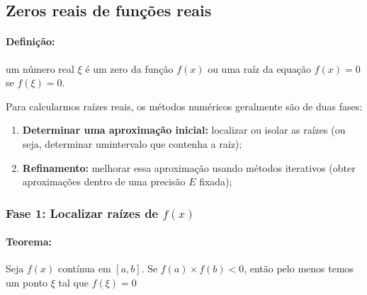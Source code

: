 \documentclass{article}
\begin{document}
            \newpage

    \subsection{Zeros reais de funções reais}
        \paragraph{Definição:} um número real $\xi$ é um zero da função $f(x)$ ou uma raíz da equação $f(x)=0$ se $f(\xi)=0$.


        Para calcularmos raízes reais, os métodos numéricos geralmente são de duas fases:

        \begin{enumerate}
            \item \textbf{Determinar uma aproximação inicial:} localizar ou isolar as raízes (ou seja, determinar umintervalo que contenha a raiz);
            \item \textbf{Refinamento:} melhorar essa aproximação usando métodos iterativos (obter aproximações dentro de uma precisão $E$ fixada);
        \end{enumerate}

        \subsubsection{Fase 1: Localizar raízes de $f(x)$}
        \paragraph{Teorema:} Seja $f(x)$ contínua em $[a,b]$. Se $f(a) \times f(b) < 0$, então pelo menos temos um ponto $\xi$ tal que $f(\xi) = 0$
\end{document}
